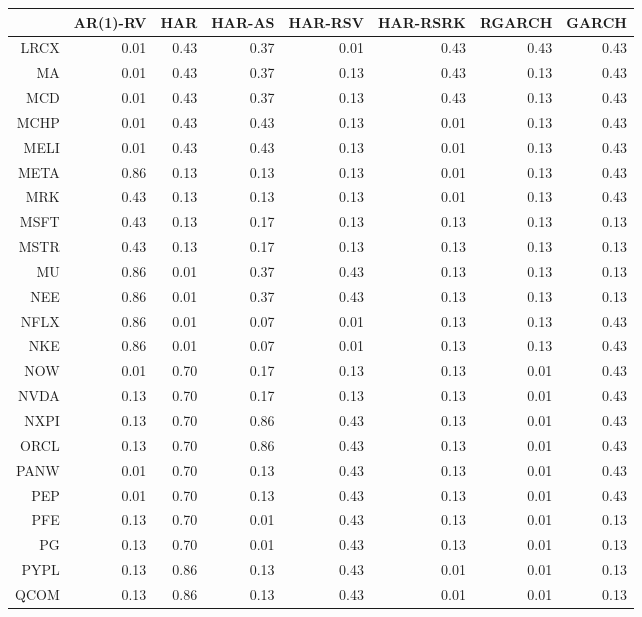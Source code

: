\begin{table}[ht]
\centering
\begin{tabular}{rrrrrrrr}
  \hline
 & AR(1)-RV & HAR & HAR-AS & HAR-RSV & HAR-RSRK & RGARCH & GARCH \\ 
  \hline
LRCX & 0.01 & 0.43 & 0.37 & 0.01 & 0.43 & 0.43 & 0.43 \\ 
  MA & 0.01 & 0.43 & 0.37 & 0.13 & 0.43 & 0.13 & 0.43 \\ 
  MCD & 0.01 & 0.43 & 0.37 & 0.13 & 0.43 & 0.13 & 0.43 \\ 
  MCHP & 0.01 & 0.43 & 0.43 & 0.13 & 0.01 & 0.13 & 0.43 \\ 
  MELI & 0.01 & 0.43 & 0.43 & 0.13 & 0.01 & 0.13 & 0.43 \\ 
  META & 0.86 & 0.13 & 0.13 & 0.13 & 0.01 & 0.13 & 0.43 \\ 
  MRK & 0.43 & 0.13 & 0.13 & 0.13 & 0.01 & 0.13 & 0.43 \\ 
  MSFT & 0.43 & 0.13 & 0.17 & 0.13 & 0.13 & 0.13 & 0.13 \\ 
  MSTR & 0.43 & 0.13 & 0.17 & 0.13 & 0.13 & 0.13 & 0.13 \\ 
  MU & 0.86 & 0.01 & 0.37 & 0.43 & 0.13 & 0.13 & 0.13 \\ 
  NEE & 0.86 & 0.01 & 0.37 & 0.43 & 0.13 & 0.13 & 0.13 \\ 
  NFLX & 0.86 & 0.01 & 0.07 & 0.01 & 0.13 & 0.13 & 0.43 \\ 
  NKE & 0.86 & 0.01 & 0.07 & 0.01 & 0.13 & 0.13 & 0.43 \\ 
  NOW & 0.01 & 0.70 & 0.17 & 0.13 & 0.13 & 0.01 & 0.43 \\ 
  NVDA & 0.13 & 0.70 & 0.17 & 0.13 & 0.13 & 0.01 & 0.43 \\ 
  NXPI & 0.13 & 0.70 & 0.86 & 0.43 & 0.13 & 0.01 & 0.43 \\ 
  ORCL & 0.13 & 0.70 & 0.86 & 0.43 & 0.13 & 0.01 & 0.43 \\ 
  PANW & 0.01 & 0.70 & 0.13 & 0.43 & 0.13 & 0.01 & 0.43 \\ 
  PEP & 0.01 & 0.70 & 0.13 & 0.43 & 0.13 & 0.01 & 0.43 \\ 
  PFE & 0.13 & 0.70 & 0.01 & 0.43 & 0.13 & 0.01 & 0.13 \\ 
  PG & 0.13 & 0.70 & 0.01 & 0.43 & 0.13 & 0.01 & 0.13 \\ 
  PYPL & 0.13 & 0.86 & 0.13 & 0.43 & 0.01 & 0.01 & 0.13 \\ 
  QCOM & 0.13 & 0.86 & 0.13 & 0.43 & 0.01 & 0.01 & 0.13 \\ 

\end{tabular}
\end{table}
